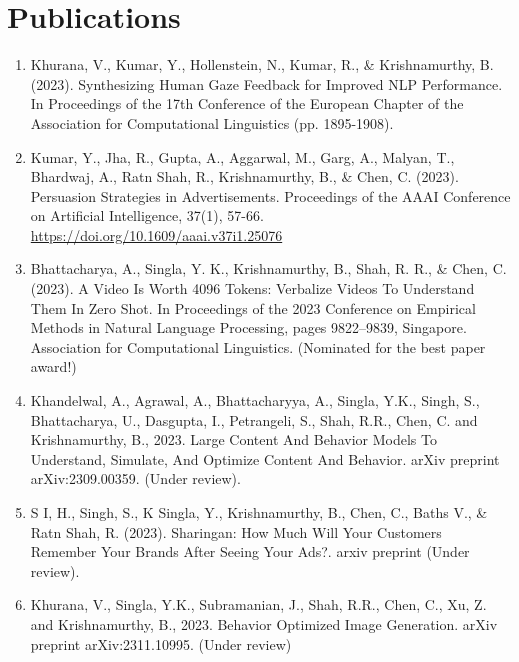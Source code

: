 \documentclass[hidelinks,11pt,a4paper]{report}
\begin{document}
\chapter*{Publications}
\begin{enumerate}
    \item Khurana, V., Kumar, Y., Hollenstein, N., Kumar, R., \& Krishnamurthy, B. (2023). Synthesizing Human Gaze Feedback for Improved NLP Performance. In Proceedings of the 17th Conference of the European Chapter of the Association for Computational Linguistics (pp. 1895-1908).
    
    \item Kumar, Y., Jha, R., Gupta, A., Aggarwal, M., Garg, A., Malyan, T., Bhardwaj, A., Ratn Shah, R., Krishnamurthy, B., \& Chen, C. (2023). Persuasion Strategies in Advertisements. Proceedings of the AAAI Conference on Artificial Intelligence, 37(1), 57-66. \url{https://doi.org/10.1609/aaai.v37i1.25076}

    \item Bhattacharya, A., Singla, Y. K., Krishnamurthy, B., Shah, R. R., \& Chen, C. (2023). A Video Is Worth 4096 Tokens: Verbalize Videos To Understand Them In Zero Shot. In Proceedings of the 2023 Conference on Empirical Methods in Natural Language Processing, pages 9822–9839, Singapore. Association for Computational Linguistics. (Nominated for the best paper award!)

    \item Khandelwal, A., Agrawal, A., Bhattacharyya, A., Singla, Y.K., Singh, S., Bhattacharya, U., Dasgupta, I., Petrangeli, S., Shah, R.R., Chen, C. and Krishnamurthy, B., 2023. Large Content And Behavior Models To Understand, Simulate, And Optimize Content And Behavior. arXiv preprint arXiv:2309.00359. (Under review). 

    \item  S I, H., Singh, S., K Singla, Y., Krishnamurthy, B., Chen, C., Baths V., \& Ratn Shah, R. (2023). Sharingan: How Much Will Your Customers Remember Your Brands After Seeing Your Ads?. arxiv preprint (Under review).

    \item Khurana, V., Singla, Y.K., Subramanian, J., Shah, R.R., Chen, C., Xu, Z. and Krishnamurthy, B., 2023. Behavior Optimized Image Generation. arXiv preprint arXiv:2311.10995. (Under review)

\end{enumerate}




\end{document}
